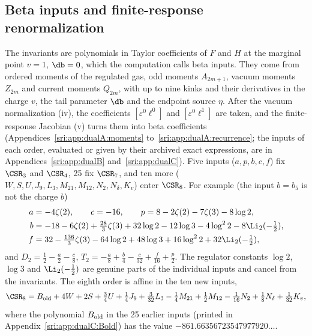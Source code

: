 \subsection{Beta inputs and finite-response renormalization}\label{sri:sec:inputs1}
The invariants are polynomials in Taylor coefficients of $F$ and $H$ at the marginal point $v=1$, $\db=0$, which
the computation calls beta inputs. They come from ordered moments of the regulated gas, odd moments $A_{2m+1}$,
vacuum moments $Z_{2m}$ and current moments $Q_{2m}$, with up to nine kinks and their derivatives in the charge $v$,
the tail parameter $\db$ and the endpoint source $\eta$. After the vacuum normalization (iv), the coefficients
$[\varepsilon^0\ell^0]$ and $[\varepsilon^0\ell^1]$ are taken, and the finite-response Jacobian (v) turns them into
beta coefficients (Appendices~\ref{sri:app:dualA:moments} to~\ref{sri:app:dualA:recurrence}; the inputs of each order,
evaluated or given by their archived exact expressions, are in Appendices~\ref{sri:app:dualB} and~\ref{sri:app:dualC}). Five inputs ($a,p,b,c,f$) fix $\CSR_3$ and $\CSR_4$, 25 fix $\CSR_7$, and ten more
($W,S,U,J_9,L_3,M_{21},M_{12},N_2,N_\delta,K_v$) enter $\CSR_8$. For example (the input $b=b_5$ is not the charge $b$)
\begin{align}
 a&=-4\zeta(2),\qquad c=-16,\qquad p=8-2\zeta(2)-7\zeta(3)-8\log2,\notag\\
 b&=-18-6\zeta(2)+\tfrac{28}{3}\zeta(3)+32\log2-12\log3-4\log^22-8\Li_2(-\tfrac12),\\
 f&=32-\tfrac{136}{3}\zeta(3)-64\log2+48\log3+16\log^22+32\Li_2(-\tfrac12),\notag
\end{align}
and $D_2=\frac12-\frac a2-\frac c8$, $T_2=-\frac a8+\frac b4-\frac c{32}+\frac f{16}+\frac p2$. The regulator
constants $\log2$, $\log3$ and $\Li_2(-\frac12)$ are genuine parts of the individual inputs and cancel from the
invariants. The eighth order is affine in the ten new inputs,
\begin{equation}
 \CSR_8=B_{\rm old}+4W+2S+\tfrac34U+\tfrac14J_9+\tfrac3{32}L_3-\tfrac14M_{21}+\tfrac12M_{12}-\tfrac1{16}N_2
 +\tfrac18N_\delta+\tfrac1{32}K_v,
 \label{sri:eq:C8assembly}
\end{equation}
where the polynomial $B_{\rm old}$ in the 25 earlier inputs (printed in Appendix~\ref{sri:app:dualC:Bold}) has the value
$-861.66356723547977920\ldots$.

